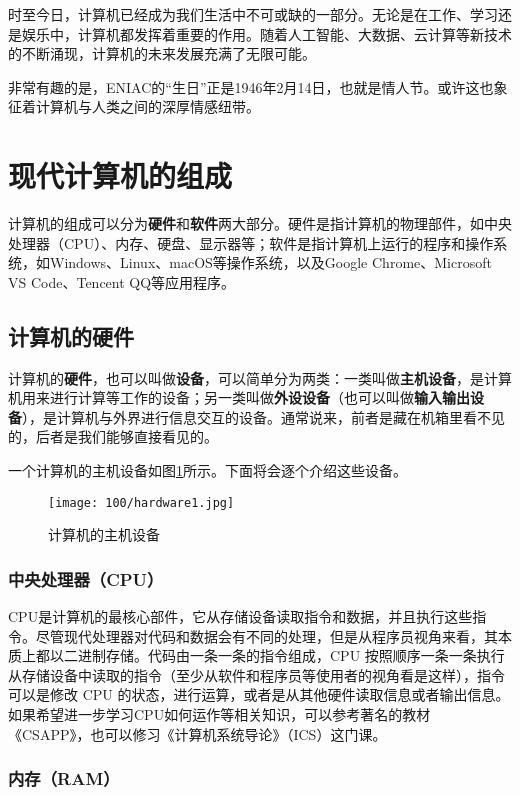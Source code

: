 时至今日，计算机已经成为我们生活中不可或缺的一部分。无论是在工作、学习还是娱乐中，计算机都发挥着重要的作用。随着人工智能、大数据、云计算等新技术的不断涌现，计算机的未来发展充满了无限可能。

非常有趣的是，ENIAC的“生日”正是1946年2月14日，也就是情人节。或许这也象征着计算机与人类之间的深厚情感纽带。

\section{现代计算机的组成}

计算机的组成可以分为\textbf{硬件}和\textbf{软件}两大部分。硬件是指计算机的物理部件，如中央处理器（CPU）、内存、硬盘、显示器等；软件是指计算机上运行的程序和操作系统，如Windows、Linux、macOS等操作系统，以及Google Chrome、Microsoft VS Code、Tencent QQ等应用程序。

\subsection{计算机的硬件}

计算机的\textbf{硬件}，也可以叫做\textbf{设备}，可以简单分为两类：一类叫做\textbf{主机设备}，是计算机用来进行计算等工作的设备；另一类叫做\textbf{外设设备}（也可以叫做\textbf{输入输出设备}），是计算机与外界进行信息交互的设备。通常说来，前者是藏在机箱里看不见的，后者是我们能够直接看见的。

一个计算机的主机设备如图\ref{fig:computer-hardware}所示。下面将会逐个介绍这些设备。
\begin{figure}[ht]
  \centering
  \texttt{[image: 100/hardware1.jpg]}
  \caption{计算机的主机设备}
  \label{fig:computer-hardware}
\end{figure}

\subsubsection{中央处理器（CPU）}

CPU是计算机的最核心部件，它从存储设备读取指令和数据，并且执行这些指令。尽管现代处理器对代码和数据会有不同的处理，但是从程序员视角来看，其本质上都以二进制存储。代码由一条一条的指令组成，CPU 按照顺序一条一条执行从存储设备中读取的指令（至少从软件和程序员等使用者的视角看是这样），指令可以是修改 CPU 的状态，进行运算，或者是从其他硬件读取信息或者输出信息。如果希望进一步学习CPU如何运作等相关知识，可以参考著名的教材《CSAPP》，也可以修习《计算机系统导论》（ICS）这门课。

\subsubsection{内存（RAM）}

